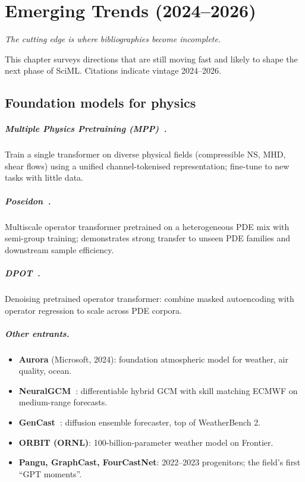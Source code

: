\chapter{Emerging Trends (2024--2026)}
\label{ch:emerging}

\epigraph{\itshape The cutting edge is where bibliographies become
incomplete.}{}

This chapter surveys directions that are still moving fast and likely
to shape the next phase of SciML. Citations indicate vintage 2024--2026.

\section{Foundation models for physics}
\paragraph{Multiple Physics Pretraining (MPP)~\cite{mccabe2024mpp}.}
Train a single transformer on diverse physical fields (compressible
NS, MHD, shear flows) using a unified channel-tokenised representation;
fine-tune to new tasks with little data.

\paragraph{Poseidon~\cite{herde2024poseidon}.}
Multiscale operator transformer pretrained on a heterogeneous PDE mix
with semi-group training; demonstrates strong transfer to unseen PDE
families and downstream sample efficiency.

\paragraph{DPOT~\cite{hao2024dpot}.}
Denoising pretrained operator transformer: combine masked autoencoding
with operator regression to scale across PDE corpora.

\paragraph{Other entrants.}
\begin{itemize}
\item \textbf{Aurora} (Microsoft, 2024): foundation atmospheric model for
weather, air quality, ocean.
\item \textbf{NeuralGCM~\cite{kochkov2024neuralgcm}}: differentiable
hybrid GCM with skill matching ECMWF on medium-range forecasts.
\item \textbf{GenCast~\cite{price2024gencast}}: diffusion ensemble
forecaster, top of WeatherBench 2.
\item \textbf{ORBIT (ORNL)}: 100-billion-parameter weather model on
Frontier.
\item \textbf{Pangu, GraphCast, FourCastNet}: 2022--2023 progenitors;
the field's first ``GPT moments''.
\end{itemize}

